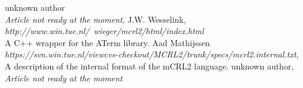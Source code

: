 \index{}\documentclass[a4paper,10pt]{article}
\theoremstyle{plain}
\theoremstyle{definition}
\begin{document}
\newpage
\begin{thebibliography}{99}
    unknown author \\
     \textit{Article not ready at the moment},
    J.W. Wesselink,
   \textit{http://www.win.tue.nl/~wieger/mcrl2/html/index.html}\\
   A C++ wrapper for the ATerm library.
    Aad Mathijssen\\
   \textit{https://svn.win.tue.nl/viewcvs-checkout/MCRL2/trunk/specs/mcrl2.internal.txt},
   A description of the internal format of the mCRL2 language.
   unknown author,
   \textit{Article not ready at the moment}

\end{thebibliography}

\newpage
\end{document}
